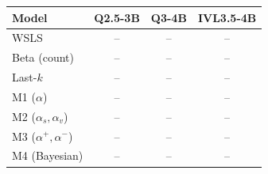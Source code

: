 \begin{tabular}{lccc}
\toprule
Model & Q2.5-3B & Q3-4B & IVL3.5-4B \\
\midrule
WSLS          & -- & -- & -- \\
Beta (count)  & -- & -- & -- \\
Last-$k$      & -- & -- & -- \\
M1 ($\alpha$) & -- & -- & -- \\
M2 ($\alpha_{s},\alpha_{v}$) & -- & -- & -- \\
M3 ($\alpha^{+},\alpha^{-}$) & -- & -- & -- \\
M4 (Bayesian) & -- & -- & -- \\
\bottomrule
\end{tabular}
